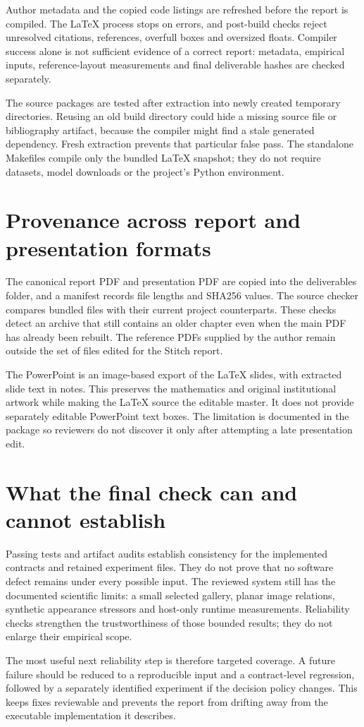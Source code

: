 Author metadata and the copied code listings are refreshed before the report is compiled. The LaTeX process stops on errors, and post-build checks reject unresolved citations, references, overfull boxes and oversized floats. Compiler success alone is not sufficient evidence of a correct report: metadata, empirical inputs, reference-layout measurements and final deliverable hashes are checked separately.

The source packages are tested after extraction into newly created temporary directories. Reusing an old build directory could hide a missing source file or bibliography artifact, because the compiler might find a stale generated dependency. Fresh extraction prevents that particular false pass. The standalone Makefiles compile only the bundled LaTeX snapshot; they do not require datasets, model downloads or the project's Python environment.

\section{Provenance across report and presentation formats}
The canonical report PDF and presentation PDF are copied into the deliverables folder, and a manifest records file lengths and SHA256 values. The source checker compares bundled files with their current project counterparts. These checks detect an archive that still contains an older chapter even when the main PDF has already been rebuilt. The reference PDFs supplied by the author remain outside the set of files edited for the Stitch report.

The PowerPoint is an image-based export of the LaTeX slides, with extracted slide text in notes. This preserves the mathematics and original institutional artwork while making the LaTeX source the editable master. It does not provide separately editable PowerPoint text boxes. The limitation is documented in the package so reviewers do not discover it only after attempting a late presentation edit.

\section{What the final check can and cannot establish}
Passing tests and artifact audits establish consistency for the implemented contracts and retained experiment files. They do not prove that no software defect remains under every possible input. The reviewed system still has the documented scientific limits: a small selected gallery, planar image relations, synthetic appearance stressors and host-only runtime measurements. Reliability checks strengthen the trustworthiness of those bounded results; they do not enlarge their empirical scope.

The most useful next reliability step is therefore targeted coverage. A future failure should be reduced to a reproducible input and a contract-level regression, followed by a separately identified experiment if the decision policy changes. This keeps fixes reviewable and prevents the report from drifting away from the executable implementation it describes.
